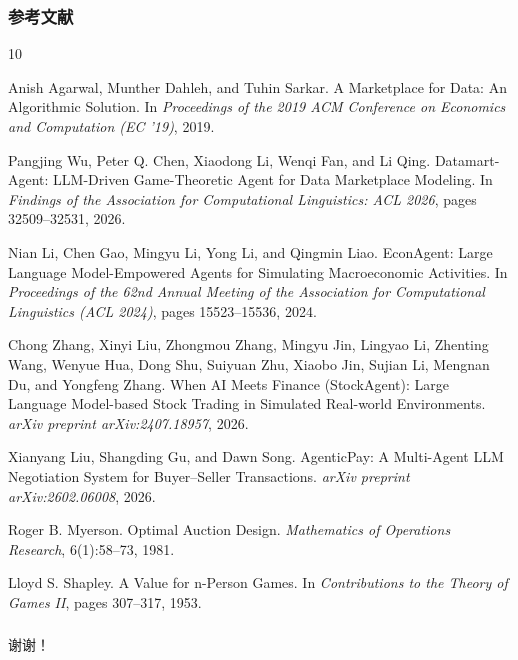 \documentclass[10pt,aspectratio=169]{beamer}
\begin{document}
\begin{frame}[allowframebreaks]
    \frametitle{参考文献}

    \begin{thebibliography}{10}\footnotesize

        Anish Agarwal, Munther Dahleh, and Tuhin Sarkar.
        \newblock A Marketplace for Data: An Algorithmic Solution.
        \newblock In \textit{Proceedings of the 2019 ACM Conference on Economics and Computation (EC '19)}, 2019.

        Pangjing Wu, Peter Q. Chen, Xiaodong Li, Wenqi Fan, and Li Qing.
        \newblock Datamart-Agent: LLM-Driven Game-Theoretic Agent for Data Marketplace Modeling.
        \newblock In \textit{Findings of the Association for Computational Linguistics: ACL 2026}, pages 32509--32531, 2026.

        Nian Li, Chen Gao, Mingyu Li, Yong Li, and Qingmin Liao.
        \newblock EconAgent: Large Language Model-Empowered Agents for Simulating Macroeconomic Activities.
        \newblock In \textit{Proceedings of the 62nd Annual Meeting of the Association for Computational Linguistics (ACL 2024)}, pages 15523--15536, 2024.

        Chong Zhang, Xinyi Liu, Zhongmou Zhang, Mingyu Jin, Lingyao Li, Zhenting Wang, Wenyue Hua, Dong Shu, Suiyuan Zhu, Xiaobo Jin, Sujian Li, Mengnan Du, and Yongfeng Zhang.
        \newblock When AI Meets Finance (StockAgent): Large Language Model-based Stock Trading in Simulated Real-world Environments.
        \newblock \textit{arXiv preprint arXiv:2407.18957}, 2026.

        Xianyang Liu, Shangding Gu, and Dawn Song.
        \newblock AgenticPay: A Multi-Agent LLM Negotiation System for Buyer--Seller Transactions.
        \newblock \textit{arXiv preprint arXiv:2602.06008}, 2026.

        Roger B. Myerson.
        \newblock Optimal Auction Design.
        \newblock \textit{Mathematics of Operations Research}, 6(1):58--73, 1981.

        Lloyd S. Shapley.
        \newblock A Value for n-Person Games.
        \newblock In \textit{Contributions to the Theory of Games II}, pages 307--317, 1953.

    \end{thebibliography}
\end{frame}

\begin{frame}
	\frametitle{}
	\begin{center}
		\vspace{2cm}
		{\huge 谢谢！}
	\end{center}
\end{frame}
\end{document}
